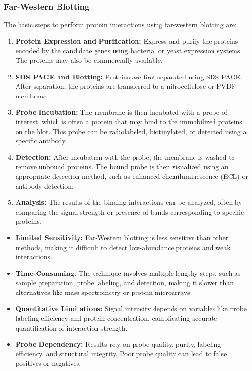 \documentclass{article}
\newcounter{subsubsubsection}[subsubsection]
\begin{document}
\subsubsection{Far-Western Blotting}
The basic steps to perform protein interactions using far-western blotting \cite{hall2004studying} are:
\begin{enumerate}
    \item \textbf{Protein Expression and Purification:} Express and purify the proteins encoded by the candidate genes using bacterial or yeast expression systems. The proteins may also be commercially available.
    \item \textbf{SDS-PAGE and Blotting:} Proteins are first separated using SDS-PAGE. After separation, the proteins are transferred to a nitrocellulose or PVDF membrane.
    \item \textbf{Probe Incubation:} The membrane is then incubated with a probe of interest, which is often a protein that may bind to the immobilized proteins on the blot. This probe can be radiolabeled, biotinylated, or detected using a specific antibody.
    \item \textbf{Detection:} After incubation with the probe, the membrane is washed to remove unbound proteins. The bound probe is then visualized using an appropriate detection method, such as enhanced chemiluminescence (ECL) or antibody detection.
    \item \textbf{Analysis:} The results of the binding interactions can be analyzed, often by comparing the signal strength or presence of bands corresponding to specific proteins.
\end{enumerate}


\begin{itemize}
    \item \textbf{Limited Sensitivity:} Far-Western blotting is less sensitive than other methods, making it difficult to detect low-abundance proteins and weak interactions.
    
    \item \textbf{Time-Consuming:} The technique involves multiple lengthy steps, such as sample preparation, probe labeling, and detection, making it slower than alternatives like mass spectrometry or protein microarrays.
    
    \item \textbf{Quantitative Limitations:} Signal intensity depends on variables like probe labeling efficiency and protein concentration, complicating accurate quantification of interaction strength.
    
    \item \textbf{Probe Dependency:} Results rely on probe quality, purity, labeling efficiency, and structural integrity. Poor probe quality can lead to false positives or negatives.
\end{itemize}
\end{document}
